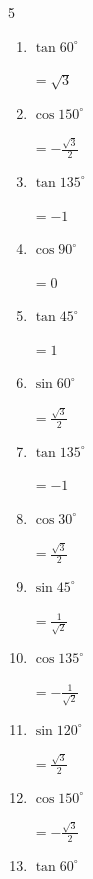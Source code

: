 \begin{multicols}{5}
\begin{enumerate}
        $\displaystyle =-1$

  \item $\displaystyle \tan{60^\circ}$

        $\displaystyle =\sqrt{3}$

  \item $\displaystyle \cos{150^\circ}$

        $\displaystyle =-\frac{\sqrt{3}}{2}$

  \item $\displaystyle \tan{135^\circ}$

        $\displaystyle =-1$

  \item $\displaystyle \cos{90^\circ}$

        $\displaystyle =0$

  \item $\displaystyle \tan{45^\circ}$

        $\displaystyle =1$

  \item $\displaystyle \sin{60^\circ}$

        $\displaystyle =\frac{\sqrt{3}}{2}$

  \item $\displaystyle \tan{135^\circ}$

        $\displaystyle =-1$

  \item $\displaystyle \cos{30^\circ}$

        $\displaystyle =\frac{\sqrt{3}}{2}$

  \item $\displaystyle \sin{45^\circ}$

        $\displaystyle =\frac{1}{\sqrt{2}}$

  \item $\displaystyle \cos{135^\circ}$

        $\displaystyle =-\frac{1}{\sqrt{2}}$

\columnbreak %

  \item $\displaystyle \sin{120^\circ}$

        $\displaystyle =\frac{\sqrt{3}}{2}$

  \item $\displaystyle \cos{150^\circ}$

        $\displaystyle =-\frac{\sqrt{3}}{2}$

  \item $\displaystyle \tan{60^\circ}$


\end{enumerate}
\end{multicols}
